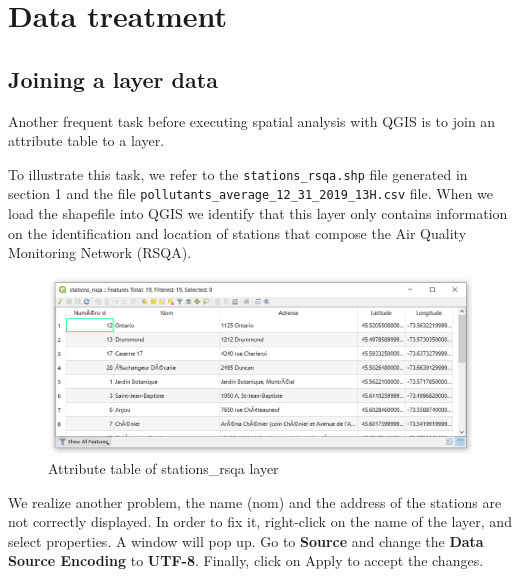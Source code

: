 \documentclass[]{book}
\theoremstyle{definition}
\theoremstyle{definition}
\theoremstyle{definition}
\theoremstyle{remark}
\begin{document}
\chapter{Data treatment}\label{data-treatment}

\section{Joining a layer data}\label{joining-a-layer-data}

Another frequent task before executing spatial analysis with QGIS is to
join an attribute table to a layer.

To illustrate this task, we refer to the \texttt{stations\_rsqa.shp}
file generated in section 1 and the file
\texttt{pollutants\_average\_12\_31\_2019\_13H.csv} file. When we load
the shapefile into QGIS we identify that this layer only contains
information on the identification and location of stations that compose
the Air Quality Monitoring Network (RSQA).

\begin{figure}

{\centering \includegraphics[width=15.43in]{figures/Change_Encoding} 

}

\caption{Attribute table of stations_rsqa layer}\label{fig:unnamed-chunk-12}
\end{figure}

We realize another problem, the name (nom) and the address of the
stations are not correctly displayed. In order to fix it, right-click on
the name of the layer, and select properties. A window will pop up. Go
to \textbf{Source} and change the \textbf{Data Source Encoding} to
\textbf{UTF-8}. Finally, click on Apply to accept the changes.
\end{document}
